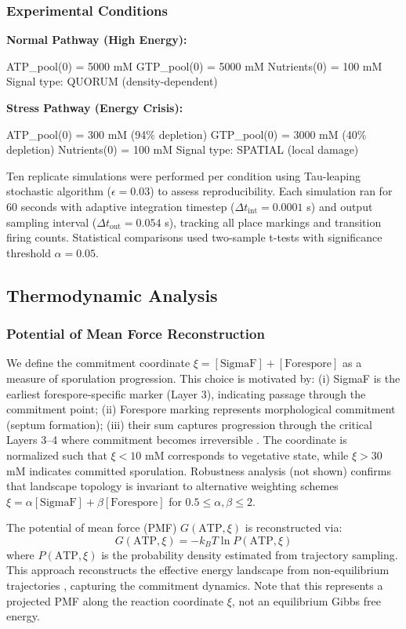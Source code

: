 \documentclass[twocolumn,11pt]{article}
\begin{document}
\subsubsection{Experimental Conditions}

\textbf{Normal Pathway (High Energy):}

ATP\_pool(0) = 5000 mM
GTP\_pool(0) = 5000 mM
Nutrients(0) = 100 mM
Signal type: QUORUM (density-dependent)


\textbf{Stress Pathway (Energy Crisis):}

ATP\_pool(0) = 300 mM (94\% depletion)
GTP\_pool(0) = 3000 mM (40\% depletion)
Nutrients(0) = 100 mM
Signal type: SPATIAL (local damage)


Ten replicate simulations were performed per condition using Tau-leaping stochastic algorithm ($\epsilon = 0.03$) to assess reproducibility. Each simulation ran for 60 seconds with adaptive integration timestep ($\Delta t_{\text{int}} = 0.0001$ s) and output sampling interval ($\Delta t_{\text{out}} = 0.054$ s), tracking all place markings and transition firing counts. Statistical comparisons used two-sample t-tests with significance threshold $\alpha = 0.05$.

\subsection{Thermodynamic Analysis}

\subsubsection{Potential of Mean Force Reconstruction}

We define the commitment coordinate $\xi = [\text{SigmaF}] + [\text{Forespore}]$ as a measure of sporulation progression. This choice is motivated by: (i) SigmaF is the earliest forespore-specific marker (Layer 3), indicating passage through the commitment point; (ii) Forespore marking represents morphological commitment (septum formation); (iii) their sum captures progression through the critical Layers 3--4 where commitment becomes irreversible \citep{piggot2004}. The coordinate is normalized such that $\xi < 10$ mM corresponds to vegetative state, while $\xi > 30$ mM indicates committed sporulation. Robustness analysis (not shown) confirms that landscape topology is invariant to alternative weighting schemes $\xi = \alpha[\text{SigmaF}] + \beta[\text{Forespore}]$ for $0.5 \leq \alpha, \beta \leq 2$.

The potential of mean force (PMF) $G(\text{ATP}, \xi)$ is reconstructed via:
\begin{equation}
    G(\text{ATP}, \xi) = -k_B T \ln P(\text{ATP}, \xi)
\end{equation}
where $P(\text{ATP}, \xi)$ is the probability density estimated from trajectory sampling. This approach reconstructs the effective energy landscape from non-equilibrium trajectories \citep{dudko2008,zwanzig1988}, capturing the commitment dynamics. Note that this represents a projected PMF along the reaction coordinate $\xi$, not an equilibrium Gibbs free energy.
\end{document}
